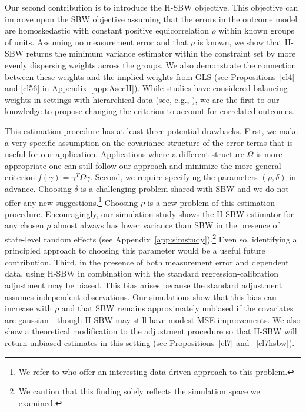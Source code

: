 \documentclass[aoas]{imsart}
\theoremstyle{plain}
\theoremstyle{remark}
\begin{document}
Our second contribution is to introduce the H-SBW objective. This objective can improve upon the SBW objective assuming that the errors in the outcome model are homoskedastic with constant positive equicorrelation $\rho$ within known groups of units. Assuming no measurement error and that $\rho$ is known, we show that H-SBW returns the minimum variance estimator within the constraint set by more evenly dispersing weights across the groups. We also demonstrate the connection between these weights and the implied weights from GLS (see Propositions~\ref{cl4} and \ref{cl56} in Appendix~\ref{app:AsecII}). While studies have considered balancing weights in settings with hierarchical data (see, e.g., \cite{keele2020hospital}), we are the first to our knowledge to propose changing the criterion to account for correlated outcomes.

This estimation procedure has at least three potential drawbacks. First, we make a very specific assumption on the covariance structure of the error terms that is useful for our application. Applications where a different structure $\Omega$ is more appropriate one can still follow our approach and minimize the more general criterion $f(\gamma) = \gamma^T\Omega\gamma$. Second, we require specifying the parameters $(\rho, \delta)$ in advance. Choosing $\delta$ is a challenging problem shared with SBW and we do not offer any new suggestions.\footnote{We refer to \cite{wang2020minimal} who offer an interesting data-driven approach to this problem.} Choosing $\rho$ is a new problem of this estimation procedure. Encouragingly, our simulation study shows the H-SBW estimator for any chosen $\rho$ almost always has lower variance than SBW in the presence of state-level random effects (see Appendix~\ref{app:simstudy}).\footnote{We caution that this finding solely reflects the simulation space we examined.} Even so, identifying a principled approach to choosing this parameter would be a useful future contribution. Third, in the presence of both measurement error and dependent data, using H-SBW in combination with the standard regression-calibration adjustment may be biased. This bias arises because the standard adjustment assumes independent observations. Our simulations show that this bias can increase with $\rho$ and that SBW remains approximately unbiased if the covariates are gaussian - though H-SBW may still have modest MSE improvements. We also show a theoretical modification to the adjustment procedure so that H-SBW will return unbiased estimates in this setting (see Propositions~\ref{cl7} and ~\ref{cl7hsbw}).
\end{document}
